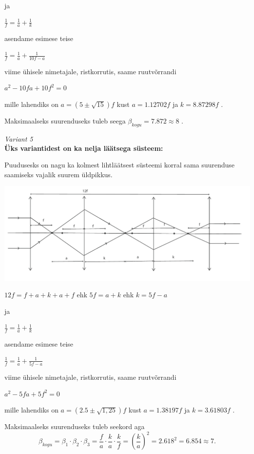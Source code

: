 ja

$ \frac {1}{f} = \frac{1}{a} + \frac{1}{k} $

asendame esimese teise

$ \frac {1}{f} = \frac {1}{a} + \frac {1}{10f - a} $

viime ühisele nimetajale, ristkorrutis, saame ruutvõrrandi

$ a^2 - 10fa + 10f^2 =0 $

mille lahendiks on $ a = (5 \pm \sqrt{15}) f $ kust $a=1.12702f $ ja $k=8.87298f$ .

Maksimaalseks suurenduseks tuleb seega $ {\beta}_{kogu} = 7.872 \approx 8 $ .

\emph{Variant 5}\\
\textbf {Üks variantidest on ka nelja läätsega süsteem:}

Puudusesks on nagu ka kolmest lihtläätsest süsteemi korral sama suurenduse saamiseks vajalik suurem üldpikkus.

\vspace{-10pt}
  \begin{center}
    \includegraphics[width=1\textwidth]{2020-v2g-10-yl5.pdf}
  \end{center}
  \vspace{-10pt}


$ 12f = f + a + k + a + f $ ehk $ 5f = a + k $ ehk $ k = 5f - a $

ja

$ \frac {1}{f} = \frac{1}{a} + \frac{1}{k} $

asendame esimese teise

$ \frac{1}{f} = \frac {1}{a} + \frac{1}{5f - a} $

viime ühisele nimetajale, ristkorrutis, saame ruutvõrrandi

$ a^2 - 5fa + 5f^2 =0 $

mille lahendiks on $ a = (2.5 \pm \sqrt{1,25}) f $ kust $a=1.38197f $ ja $k=3.61803f$ .

Maksimaalseks suurenduseks tuleb seekord aga  
\[ {\beta}_{kogu} = {\beta}_1 \cdot {\beta}_2 \cdot {\beta}_3 = \frac {f}{a} \cdot \frac {k}{a} \cdot \frac {k}{f} = {(\frac {k}{a})}^2 = 2.618^2 = 6.854 \approx 7. \]
\probend